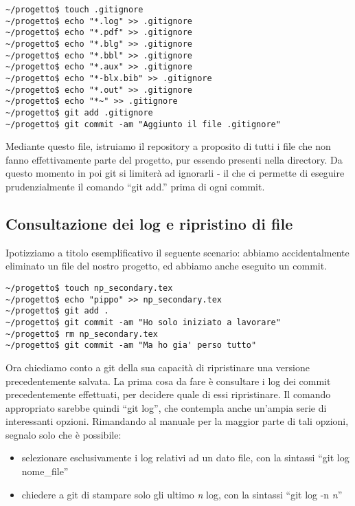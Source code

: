\documentclass[a4paper,12pt,oneside]{article}
\begin{document}
\begin{lstlisting}
~/progetto$ touch .gitignore
~/progetto$ echo "*.log" >> .gitignore
~/progetto$ echo "*.pdf" >> .gitignore
~/progetto$ echo "*.blg" >> .gitignore
~/progetto$ echo "*.bbl" >> .gitignore
~/progetto$ echo "*.aux" >> .gitignore
~/progetto$ echo "*-blx.bib" >> .gitignore
~/progetto$ echo "*.out" >> .gitignore
~/progetto$ echo "*~" >> .gitignore
~/progetto$ git add .gitignore
~/progetto$ git commit -am "Aggiunto il file .gitignore"
\end{lstlisting}

Mediante questo file, istruiamo il repository a proposito di tutti i
file che non fanno effettivamente parte del progetto, pur essendo presenti
nella directory.
Da questo momento in poi git si limiterà ad ignorarli - il che ci permette di
eseguire prudenzialmente il comando ``git add.'' prima di ogni commit.

\subsection{Consultazione dei log e ripristino di file}
Ipotizziamo a titolo esemplificativo il seguente scenario:
abbiamo accidentalmente eliminato un file del nostro
progetto, ed abbiamo anche eseguito un commit.

\begin{lstlisting}
~/progetto$ touch np_secondary.tex
~/progetto$ echo "pippo" >> np_secondary.tex
~/progetto$ git add .
~/progetto$ git commit -am "Ho solo iniziato a lavorare"
~/progetto$ rm np_secondary.tex
~/progetto$ git commit -am "Ma ho gia' perso tutto"
\end{lstlisting}

Ora chiediamo conto a git della sua capacità di ripristinare una versione
precedentemente salvata. La prima cosa da fare è consultare i log dei commit
precedentemente effettuati, per decidere quale di essi ripristinare. Il comando
appropriato sarebbe quindi ``git log'', che contempla anche un'ampia serie di
interessanti opzioni. Rimandando al manuale per la maggior parte di tali
opzioni, segnalo solo che è possibile:
\begin{itemize}
\item selezionare esclusivamente i log relativi ad un dato file, con la
sintassi ``git log nome\_file''
\item chiedere a git di stampare solo gli ultimo \textit{n} log, con la
sintassi ``git log -n \textit{n}''
\end{itemize}
\end{document}
